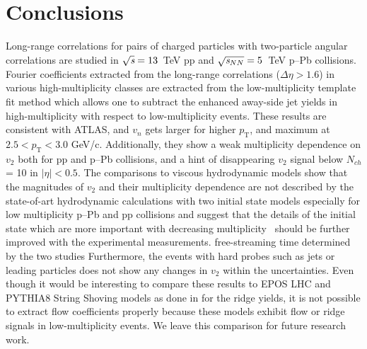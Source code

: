 
\section{Conclusions}
\label{sec:summary}
Long-range correlations for pairs of charged particles with two-particle angular correlations are studied in ${\sqrt{{\textit s}}}=13$~TeV pp and ${\sqrt{{\textit s_{NN}}}}=5$~TeV p--Pb collisions. Fourier coefficients extracted from the long-range correlations ($\Delta\eta > 1.6$) in various high-multiplicity classes are extracted from the low-multiplicity template fit method which allows one to subtract the enhanced away-side jet yields in high-multiplicity with respect to low-multiplicity events.
These results are consistent with ATLAS, and $v_n$ gets larger for higher $p_\mathrm{T}$, and maximum at $2.5<p_\mathrm{T}<3.0$ GeV/c. 
Additionally, they show a weak multiplicity dependence on $v_2$ both for pp and p--Pb collisions, and a hint of disappearing $v_2$ signal below $N_{ch}$ = 10 in $|\eta|<0.5$. 
The comparisons to viscous hydrodynamic models show that the magnitudes of $v_2$ and their multiplicity dependence are not described by the state-of-art hydrodynamic calculations with two initial state models especially for low multiplicity p--Pb and pp collisions and suggest that the details of the initial state which are more important with decreasing multiplicity~\cite{Greif:2017bnr,Moreland:2018gsh} should be further improved with the experimental measurements. 
free-streaming time determined by the two studies
Furthermore, the events with hard probes such as jets or leading particles does not show any changes in $v_2$ within the uncertainties. 
Even though it would be interesting to compare these results to EPOS LHC and PYTHIA8 String Shoving models as done in \cite{ALICE:2012eyl} for the ridge yields, it is not possible to extract flow coefficients properly because these models exhibit flow or ridge signals in low-multiplicity events. We leave this comparison for future research work.


